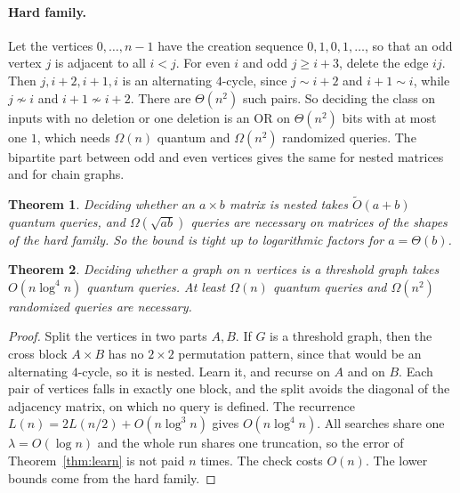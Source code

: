 \documentclass[11pt]{article}
\newtheorem{theorem}{Theorem}[section]
\theoremstyle{remark}
\newcommand{\Ot}{\tilde O}
\begin{document}
\paragraph{Hard family.} Let the vertices $0,\dots,n-1$ have the creation sequence $0,1,0,1,\dots$, so that an odd vertex $j$ is adjacent to all $i<j$. For even $i$ and odd $j\ge i+3$, delete the edge $ij$. Then $j,i+2,i+1,i$ is an alternating $4$-cycle, since $j\sim i+2$ and $i+1\sim i$, while $j\not\sim i$ and $i+1\not\sim i+2$. There are $\Theta(n^2)$ such pairs. So deciding the class on inputs with no deletion or one deletion is an OR on $\Theta(n^2)$ bits with at most one $1$, which needs $\Omega(n)$ quantum and $\Omega(n^2)$ randomized queries. The bipartite part between odd and even vertices gives the same for nested matrices and for chain graphs.

\begin{theorem}\label{thm:nested}
Deciding whether an $a\times b$ matrix is nested takes $\Ot(a+b)$ quantum queries, and $\Omega(\sqrt{ab})$ queries are necessary on matrices of the shapes of the hard family. So the bound is tight up to logarithmic factors for $a=\Theta(b)$.
\end{theorem}

\begin{theorem}\label{thm:threshold}
Deciding whether a graph on $n$ vertices is a threshold graph takes $O(n\log^4 n)$ quantum queries. At least $\Omega(n)$ quantum queries and $\Omega(n^2)$ randomized queries are necessary.
\end{theorem}
\begin{proof}
Split the vertices in two parts $A,B$. If $G$ is a threshold graph, then the cross block $A\times B$ has no $2\times2$ permutation pattern, since that would be an alternating $4$-cycle, so it is nested. Learn it, and recurse on $A$ and on $B$. Each pair of vertices falls in exactly one block, and the split avoids the diagonal of the adjacency matrix, on which no query is defined. The recurrence $L(n)=2L(n/2)+O(n\log^3 n)$ gives $O(n\log^4 n)$. All searches share one $\lambda=O(\log n)$ and the whole run shares one truncation, so the error of Theorem~\ref{thm:learn} is not paid $n$ times. The check costs $O(n)$. The lower bounds come from the hard family.
\end{proof}
\end{document}
